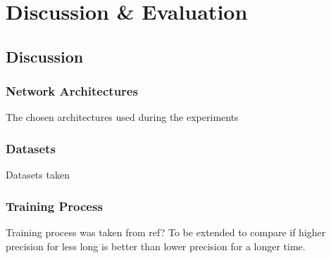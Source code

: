 \chapter{Discussion \& Evaluation} %

\label{Chapter8} %



\section{Discussion}


\subsection{Network Architectures}

The chosen architectures used during the experiments


\subsection{Datasets}

Datasets taken



\subsection{Training Process}

Training process was taken from ref? To be extended to compare if higher precision for less long is better than lower precision for a longer time.

